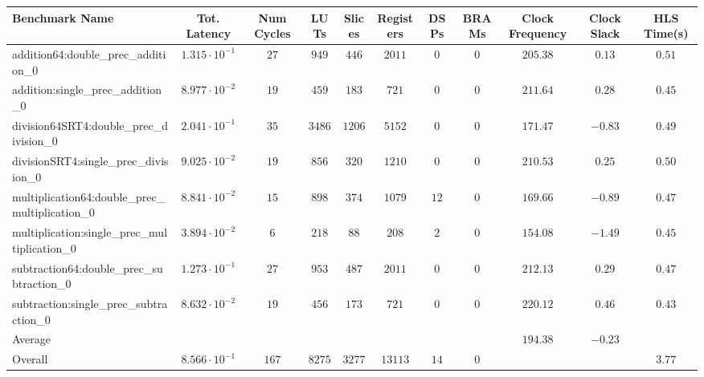 \begin{tabular}{|l|c|c|c|c|c|c|c|c|c|c|}
\hline
Benchmark Name                                   & Tot. Latency            & Num Cycles & LUTs     & Slices   & Registers & DSPs   & BRAMs & Clock Frequency & Clock Slack & HLS Time(s) \\
\hline
addition64:double\_prec\_addition\_0             & $ 1.315 \cdot 10^{-1} $ & $ 27     $ & $ 949  $ & $ 446  $ & $ 2011  $ & $ 0  $ & $ 0 $ & $ 205.38      $ & $ 0.13    $ & $ 0.51    $ \\
addition:single\_prec\_addition\_0               & $ 8.977 \cdot 10^{-2} $ & $ 19     $ & $ 459  $ & $ 183  $ & $ 721   $ & $ 0  $ & $ 0 $ & $ 211.64      $ & $ 0.28    $ & $ 0.45    $ \\
division64SRT4:double\_prec\_division\_0         & $ 2.041 \cdot 10^{-1} $ & $ 35     $ & $ 3486 $ & $ 1206 $ & $ 5152  $ & $ 0  $ & $ 0 $ & $ 171.47      $ & $ -0.83   $ & $ 0.49    $ \\
divisionSRT4:single\_prec\_division\_0           & $ 9.025 \cdot 10^{-2} $ & $ 19     $ & $ 856  $ & $ 320  $ & $ 1210  $ & $ 0  $ & $ 0 $ & $ 210.53      $ & $ 0.25    $ & $ 0.50    $ \\
multiplication64:double\_prec\_multiplication\_0 & $ 8.841 \cdot 10^{-2} $ & $ 15     $ & $ 898  $ & $ 374  $ & $ 1079  $ & $ 12 $ & $ 0 $ & $ 169.66      $ & $ -0.89   $ & $ 0.47    $ \\
multiplication:single\_prec\_multiplication\_0   & $ 3.894 \cdot 10^{-2} $ & $ 6      $ & $ 218  $ & $ 88   $ & $ 208   $ & $ 2  $ & $ 0 $ & $ 154.08      $ & $ -1.49   $ & $ 0.45    $ \\
subtraction64:double\_prec\_subtraction\_0       & $ 1.273 \cdot 10^{-1} $ & $ 27     $ & $ 953  $ & $ 487  $ & $ 2011  $ & $ 0  $ & $ 0 $ & $ 212.13      $ & $ 0.29    $ & $ 0.47    $ \\
subtraction:single\_prec\_subtraction\_0         & $ 8.632 \cdot 10^{-2} $ & $ 19     $ & $ 456  $ & $ 173  $ & $ 721   $ & $ 0  $ & $ 0 $ & $ 220.12      $ & $ 0.46    $ & $ 0.43    $ \\
\hline
Average                                          & $                     $ & $        $ & $      $ & $      $ & $       $ & $    $ & $   $ & $ 194.38      $ & $ -0.23   $ & $         $ \\
\hline
Overall                                          & $ 8.566 \cdot 10^{-1} $ & $ 167    $ & $ 8275 $ & $ 3277 $ & $ 13113 $ & $ 14 $ & $ 0 $ & $             $ & $         $ & $ 3.77    $ \\
\hline
\end{tabular}
